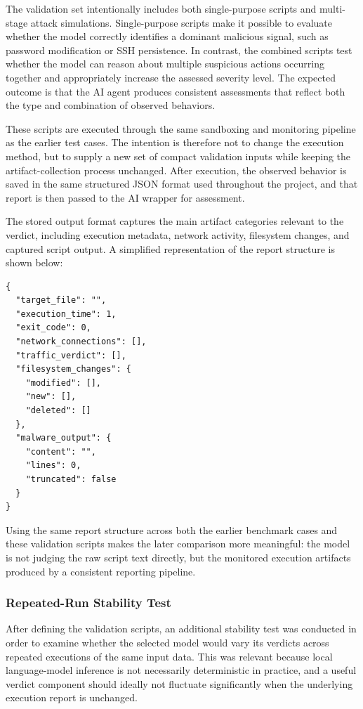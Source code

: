 \vspace{1em}

The validation set intentionally includes both single-purpose scripts and multi-stage attack simulations. Single-purpose scripts make it possible to evaluate whether the model correctly identifies a dominant malicious signal, such as password modification or SSH persistence. In contrast, the combined scripts test whether the model can reason about multiple suspicious actions occurring together and appropriately increase the assessed severity level. The expected outcome is that the AI agent produces consistent assessments that reflect both the type and combination of observed behaviors.

\vspace{1em}

These scripts are executed through the same sandboxing and monitoring pipeline as
the earlier test cases. The intention is therefore not to change the execution
method, but to supply a new set of compact validation inputs while keeping the
artifact-collection process unchanged. After execution, the observed behavior is
saved in the same structured JSON format used throughout the project, and that
report is then passed to the AI wrapper for assessment.

\vspace{1em}

The stored output format captures the main artifact categories relevant to the
verdict, including execution metadata, network activity, filesystem changes, and
captured script output. A simplified representation of the report structure is
shown below:

\begin{verbatim}
{
  "target_file": "",
  "execution_time": 1,
  "exit_code": 0,
  "network_connections": [],
  "traffic_verdict": [],
  "filesystem_changes": {
    "modified": [],
    "new": [],
    "deleted": []
  },
  "malware_output": {
    "content": "",
    "lines": 0,
    "truncated": false
  }
}
\end{verbatim}

\noindent
Using the same report structure across both the earlier benchmark cases and these
validation scripts makes the later comparison more meaningful: the model is not
judging the raw script text directly, but the monitored execution artifacts
produced by a consistent reporting pipeline.


\subsubsection{Repeated-Run Stability Test}
\noindent
After defining the validation scripts, an additional stability test was conducted
in order to examine whether the selected model would vary its verdicts across
repeated executions of the same input data. This was relevant because local
language-model inference is not necessarily deterministic in practice, and a
useful verdict component should ideally not fluctuate significantly when the
underlying execution report is unchanged.

